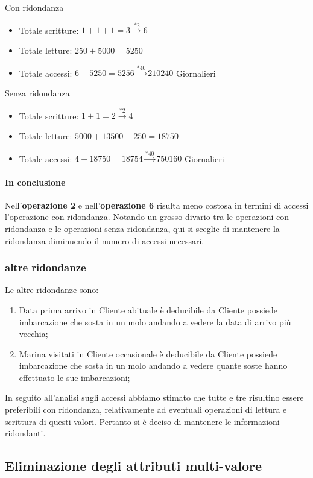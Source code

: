 Con ridondanza
\begin{itemize}
    \item Totale scritture: $1 + 1 + 1 = 3 \xrightarrow{*2} 6$ 
    \item Totale letture: $250 + 5000 = 5250$
    \item Totale accessi: $6+5250 = 5256 \xrightarrow{*40} 210240$ Giornalieri
\end{itemize}
Senza ridondanza
\begin{itemize}
    \item Totale scritture: $1 + 1 = 2 \xrightarrow{*2} 4$ 
    \item Totale letture: $5000 + 13500 + 250 = 18750$
    \item Totale accessi: $4+18750 = 18754 \xrightarrow{*40} 750160$ Giornalieri
\end{itemize}

\paragraph{In conclusione}
Nell'\textbf{operazione 2} e nell'\textbf{operazione 6} risulta meno costosa in termini di accessi l'operazione con ridondanza. Notando un grosso divario tra le operazioni con ridondanza e le operazioni senza ridondanza, qui si sceglie di mantenere la ridondanza diminuendo il numero di accessi necessari.

\subsubsection{altre ridondanze}

Le altre ridondanze sono:
\begin{enumerate}
    \item Data prima arrivo in Cliente abituale è deducibile da Cliente possiede imbarcazione che sosta in un molo andando a vedere la data di arrivo più vecchia;
    \item Marina visitati in Cliente occasionale è deducibile da Cliente possiede imbarcazione che sosta in un molo andando a vedere quante soste hanno effettuato le sue imbarcazioni;
\end{enumerate}

In seguito all'analisi sugli accessi abbiamo stimato che tutte e tre risultino essere preferibili con ridondanza, relativamente ad eventuali operazioni di lettura e scrittura di questi valori. Pertanto si è deciso di mantenere le informazioni ridondanti.


\subsection{Eliminazione degli attributi multi-valore}

